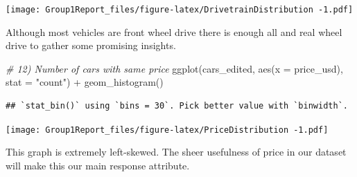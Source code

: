 \documentclass[
]{article}
\newenvironment{Shaded}{\begin{snugshade}}{\end{snugshade}}
\newcommand{\AttributeTok}[1]{\textcolor[rgb]{0.77,0.63,0.00}{#1}}
\newcommand{\CommentTok}[1]{\textcolor[rgb]{0.56,0.35,0.01}{\textit{#1}}}
\newcommand{\DecValTok}[1]{\textcolor[rgb]{0.00,0.00,0.81}{#1}}
\newcommand{\FloatTok}[1]{\textcolor[rgb]{0.00,0.00,0.81}{#1}}
\newcommand{\FunctionTok}[1]{\textcolor[rgb]{0.00,0.00,0.00}{#1}}
\newcommand{\NormalTok}[1]{#1}
\newcommand{\OtherTok}[1]{\textcolor[rgb]{0.56,0.35,0.01}{#1}}
\newcommand{\SpecialCharTok}[1]{\textcolor[rgb]{0.00,0.00,0.00}{#1}}
\newcommand{\StringTok}[1]{\textcolor[rgb]{0.31,0.60,0.02}{#1}}
\begin{document}
\texttt{[image: Group1Report\_files/figure-latex/DrivetrainDistribution -1.pdf]}

Although most vehicles are front wheel drive there is enough all and
real wheel drive to gather some promising insights.

\begin{Shaded}
\begin{Highlighting}[]
\CommentTok{\# 12) Number of cars with same price}
\FunctionTok{ggplot}\NormalTok{(cars\_edited, }\FunctionTok{aes}\NormalTok{(}\AttributeTok{x =}\NormalTok{ price\_usd), }\AttributeTok{stat =} \StringTok{"count"}\NormalTok{) }\SpecialCharTok{+} \FunctionTok{geom\_histogram}\NormalTok{()}
\end{Highlighting}
\end{Shaded}

\begin{verbatim}
## `stat_bin()` using `bins = 30`. Pick better value with `binwidth`.
\end{verbatim}

\texttt{[image: Group1Report\_files/figure-latex/PriceDistribution -1.pdf]}

This graph is extremely left-skewed. The sheer usefulness of price in
our dataset will make this our main response attribute.

\begin{Shaded}
\end{Shaded}
\end{document}

